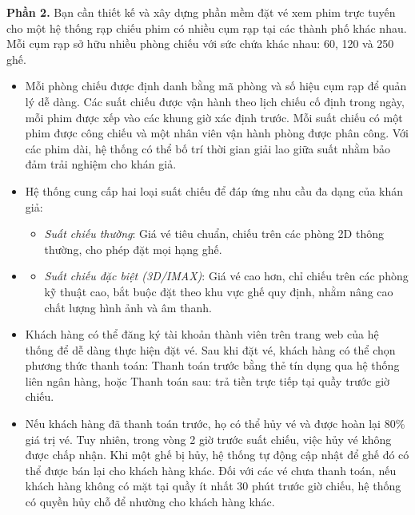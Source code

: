 \documentclass[11pt,a4paper]{article}
\begin{document}
\vspace{4pt}
\noindent\textbf{Phần 2.} Bạn cần thiết kế và xây dựng phần mềm đặt vé xem phim trực tuyến cho một hệ thống rạp chiếu phim có nhiều cụm rạp tại các thành phố khác nhau. Mỗi cụm rạp sở hữu nhiều phòng chiếu với sức chứa khác nhau: 60, 120 và 250 ghế.
\begin{itemize}[leftmargin=1.05cm,itemsep=2pt,topsep=1pt,parsep=0pt]
  \item Mỗi phòng chiếu được định danh bằng mã phòng và số hiệu cụm rạp để quản lý dễ dàng. Các suất chiếu được vận hành theo lịch chiếu cố định trong ngày, mỗi phim được xếp vào các khung giờ xác định trước. Mỗi suất chiếu có một phim được công chiếu và một nhân viên vận hành phòng được phân công. Với các phim dài, hệ thống có thể bố trí thời gian giải lao giữa suất nhằm bảo đảm trải nghiệm cho khán giả.
  \item Hệ thống cung cấp hai loại suất chiếu để đáp ứng nhu cầu đa dạng của khán giả:
  \begin{itemize}[leftmargin=0.75cm,itemsep=0pt,topsep=1pt,parsep=0pt]
    \item \textit{Suất chiếu thường}: Giá vé tiêu chuẩn, chiếu trên các phòng 2D thông thường, cho phép đặt mọi hạng ghế.
  \end{itemize}
\end{itemize}

\begin{itemize}[leftmargin=1.05cm,itemsep=2pt,topsep=0pt,parsep=0pt]
  \item[]
  \begin{itemize}[leftmargin=0.75cm,itemsep=0pt,topsep=0pt,parsep=0pt]
    \item \textit{Suất chiếu đặc biệt (3D/IMAX)}: Giá vé cao hơn, chỉ chiếu trên các phòng kỹ thuật cao, bắt buộc đặt theo khu vực ghế quy định, nhằm nâng cao chất lượng hình ảnh và âm thanh.
  \end{itemize}
  \item Khách hàng có thể đăng ký tài khoản thành viên trên trang web của hệ thống để dễ dàng thực hiện đặt vé. Sau khi đặt vé, khách hàng có thể chọn phương thức thanh toán: Thanh toán trước bằng thẻ tín dụng qua hệ thống liên ngân hàng, hoặc Thanh toán sau: trả tiền trực tiếp tại quầy trước giờ chiếu.
  \item Nếu khách hàng đã thanh toán trước, họ có thể hủy vé và được hoàn lại 80\% giá trị vé. Tuy nhiên, trong vòng 2 giờ trước suất chiếu, việc hủy vé không được chấp nhận. Khi một ghế bị hủy, hệ thống tự động cập nhật để ghế đó có thể được bán lại cho khách hàng khác. Đối với các vé chưa thanh toán, nếu khách hàng không có mặt tại quầy ít nhất 30 phút trước giờ chiếu, hệ thống có quyền hủy chỗ để nhường cho khách hàng khác.
\end{itemize}
\end{document}
